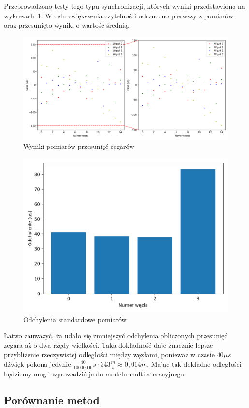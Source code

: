 Przeprowadzono testy tego typu synchronizacji, których wyniki przedstawiono na wykresach~\ref{pic:mic_sync}. W celu zwiększenia czytelności odrzucono pierwszy z pomiarów oraz przesunięto wyniki o wartość średnią.

\begin{figure}[H]
    \centering
    \includegraphics[width=\textwidth]{pics/mic_sync/offsets.png}
    \caption{Wyniki pomiarów przesunięć zegarów}
    \label{pic:mic_sync}
\end{figure}

\begin{figure}[H]
    \centering
    \includegraphics[width=.49\textwidth]{pics/mic_sync/stddev_offsets.png}
    \caption{Odchylenia standardowe pomiarów}
    \label{pic:stddev_mic}
\end{figure}

Łatwo zauważyć, ża udało się zmniejszyć odchylenia obliczonych przesunięć zegara aż o dwa rzędy wielkości. Taka dokładność daje znacznie lepsze przybliżenie rzeczywistej odległości między węzłami, ponieważ w czasie $40 \mu s$ dźwięk pokona jedynie $\frac{40}{10000000}s \cdot 343 \frac{m}{s} \approx 0,014m$. Mając tak dokładne odległości będziemy mogli wprowadzić je do modelu multilateracyjnego.

\subsection{Porównanie metod}


